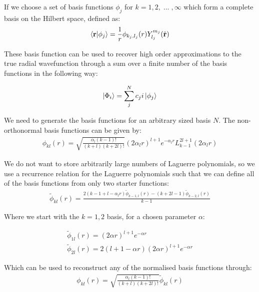 \documentclass{article}
\renewcommand{\vec}[1]{\mathbf{#1}}
\let\oldhat\hat
\renewcommand{\hat}[1]{\oldhat{\mathbf{#1}}}
\begin{document}
    If we choose a set of basis functions $\phi_{j}$ for $k={1,2,\; ...\;, \infty}$ which form a complete basis on the Hilbert space, defined as:
    \large
    \begin{gather}
    	\braket{\vec{r}}{\phi_j} = \frac{1}{r}\phi_{k_j,l_j}(r)Y^{m_j}_{l_j}(\hat{\vec{r}})
    \end{gather}
    \normalsize
    
    These basis function can be used to recover high order approximations to the true radial wavefunction through a sum over a finite number of the basis functions in the following way:
   
    \large
    \begin{gather}
    	\ket{\Phi_i} = \sum_{j}^{N} c_ji \ket{\phi_j}
    \end{gather}
    \normalsize
    
    We need to generate the basis functions for an arbitrary sized basis $N$.
    The non-orthonormal basis functions can be given by:
    \begin{gather}
    	\phi_{kl}(r) = \sqrt{\frac{\alpha_l (k-1)!}{(k+l)(k+2l)!}}(2\alpha_l r)^{l+1} e^{-\alpha_l r} L^{2l+1}_{k-1}(2\alpha_l r)
    \end{gather}
    
    We do not want to store arbitrarily large numbers of Laguerre polynomials, so we use a recurrence relation for the Laguerre polynomials such that we can define all of the basis functions from only two starter functions:
    \begin{gather}
    	\tilde{\phi}_{kl}(r) = \frac{2(k-1+l-\alpha_lr)\tilde{\phi}_{k-1,l}(r) - (k+2l-1)\tilde{\phi}_{k-2,l}(r)}{k-1}
    \end{gather}
    
    Where we start with the $k=1,2$ basis, for a chosen parameter $\alpha$:
    
    \begin{gather}
    	\tilde{\phi}_{1l}(r) = (2\alpha r)^{l+1}e^{-\alpha r}\\
    	\tilde{\phi}_{2l}(r) = 2(l+1-\alpha r)(2\alpha r)^{l+1}e^{-\alpha r}
    \end{gather}
    
    Which can be used to reconstruct any of the normalised basis functions through:
    \begin{gather}
    	\phi_{kl}(r) = \sqrt{\frac{\alpha_l (k-1)!}{(k+l)(k+2l)!}}\tilde{\phi}_{kl}(r)
    \end{gather}
    
\end{document}
